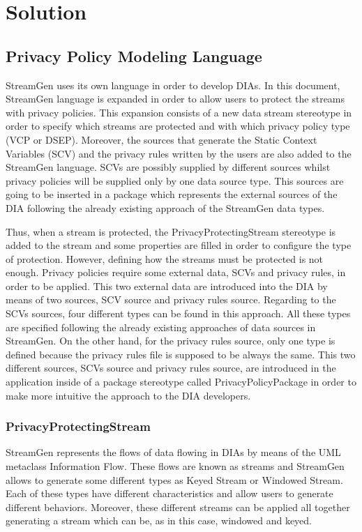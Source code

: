 \chapter[Chapter 4]{Solution}
\label{sec:chapter4}

\section{Privacy Policy Modeling Language}

StreamGen uses its own language in order to develop DIAs. In this document, StreamGen language is expanded in order to allow users to protect the streams with privacy policies. This expansion consists of a new data stream stereotype in order to specify which streams are protected and with which privacy policy type (VCP or DSEP). Moreover, the sources that generate the Static Context Variables (SCV) and the privacy rules written by the users are also added to the StreamGen language. SCVs are possibly supplied by different sources whilst privacy policies will be supplied only by one data source type. This sources are going to be inserted in a package which represents the external sources of the DIA following the already existing approach of the StreamGen data types.

Thus, when a stream is protected, the PrivacyProtectingStream stereotype is added to the stream and some properties are filled in order to configure the type of protection. However, defining how the streams must be protected is not enough. Privacy policies require some external data, SCVs and privacy rules, in order to be applied. This two external data are introduced into the DIA by means of two sources, SCV source and privacy rules source. Regarding to the SCVs sources, four different types can be found in this approach. All these types are specified following the already existing approaches of data sources in StreamGen. On the other hand, for the privacy rules source, only one type is defined because the privacy rules file is supposed to be always the same. This two different sources, SCVs source and privacy rules source, are introduced in the application inside of a package stereotype called PrivacyPolicyPackage in order to make more intuitive the approach to the DIA developers.

\subsection{PrivacyProtectingStream}

StreamGen represents the flows of data flowing in DIAs by means of the UML metaclass Information Flow. These flows are known as streams and StreamGen allows to generate some different types as Keyed Stream or Windowed Stream. Each of these types have different characteristics and allow users to generate different behaviors. Moreover, these different streams can be applied all together generating a stream which can be, as in this case, windowed and keyed.

